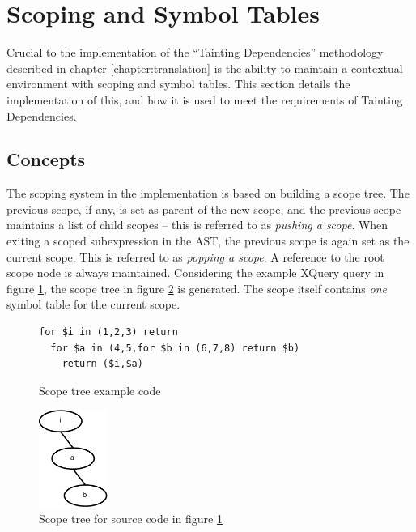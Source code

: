 \section{Scoping and Symbol Tables}
Crucial to the implementation of the ``Tainting Dependencies'' methodology
described in chapter \ref{chapter:translation} is the ability to
maintain a contextual environment with scoping and symbol tables. This section
details the implementation of this, and how it is used to meet the
requirements of Tainting Dependencies.

\subsection{Concepts}
The scoping system in the implementation is based on building a scope tree. The
previous scope, if any, is set as parent of the new scope, and the previous
scope maintains a list of child scopes -- this is referred to as
\textit{pushing a scope}. When exiting a scoped subexpression in the AST, the
previous scope is again set as the current scope. This is referred to as
\textit{popping a scope}. A reference to the root scope node is always
maintained. Considering the example XQuery query in figure
\ref{fig:impl:scope_tree_ex_code}, the scope tree in figure
\ref{fig:impl:scope_tree_ex} is generated. The scope itself contains \emph{one}
symbol table for the current scope.

\begin{figure}[!htp]
\begin{center}
\begin{minipage}[h]{9cm}
\begin{verbatim}
for $i in (1,2,3) return 
  for $a in (4,5,for $b in (6,7,8) return $b) 
    return ($i,$a)
\end{verbatim}
  \caption{Scope tree example code}
  \label{fig:impl:scope_tree_ex_code}
  \end{minipage}
\end{center}
\end{figure}

\begin{figure}[!htp]
\begin{center}
  \includegraphics[width=0.2\textwidth]{diagrams/scope_tree_ex}
  \caption{Scope tree for source code in figure
  \ref{fig:impl:scope_tree_ex_code}} 
  \label{fig:impl:scope_tree_ex}
\end{center}
\end{figure}

